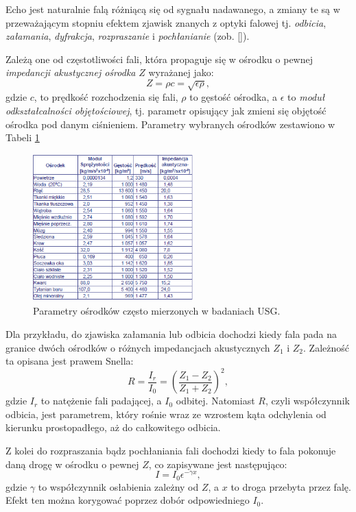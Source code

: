 Echo jest naturalnie falą różniącą się od sygnału nadawanego, a zmiany te są w przeważającym stopniu efektem zjawisk znanych z optyki falowej tj. \textit{odbicia}, \textit{załamania}, \textit{dyfrakcja}, \textit{rozpraszanie} i \textit{pochłanianie} (zob. []).

Zależą one od częstotliwości fali, która propaguje się w ośrodku o pewnej \textit{impedancji akustycznej ośrodka} $Z$ wyrażanej jako:
\begin{equation}
Z = \rho c = \sqrt{\epsilon \rho},
\end{equation}
gdzie $c$, to prędkość rozchodzenia się fali, $\rho$ to gęstość ośrodka, a $\epsilon$ to \textit{moduł odkształcalności objętościowej}, tj. parametr opisujący jak zmieni się objętość ośrodka pod danym ciśnieniem. Parametry wybranych ośrodków zestawiono w Tabeli \ref{USG-params} 
\begin{figure}[h!]
	\centering
	\includegraphics[width=0.55\textwidth]{figures/USG-params.png}
	\caption{Parametry ośrodków często mierzonych w badaniach USG.}
	\label{USG-params}
\end{figure}

Dla przykładu, do zjawiska załamania lub odbicia dochodzi kiedy fala pada na granice dwóch ośrodków o różnych impedancjach akustycznych $Z_1$ i $Z_2$. Zależność ta opisana jest prawem Snella:
\begin{equation}
R = \frac{I_r}{I_0} = \left(\frac{Z_1-Z_2}{Z_1+Z_2}\right)^2,
\end{equation}
gdzie $I_r$ to natężenie fali padającej, a $I_0$ odbitej. Natomiast $R$, czyli współczynnik odbicia, jest parametrem, który rośnie wraz ze wzrostem kąta odchylenia od kierunku prostopadłego, aż do całkowitego odbicia.

Z kolei do rozpraszania bądz pochłaniania fali dochodzi kiedy to fala pokonuje daną drogę w ośrodku o pewnej $Z$, co zapisywane jest następująco:
\begin{equation}
I=I_0 \epsilon^{-\gamma x},
\end{equation}
gdzie $\gamma$ to współczynnik osłabienia zależny od $Z$, a $x$ to droga przebyta przez falę. Efekt ten można korygować poprzez dobór odpowiedniego $I_0$.

